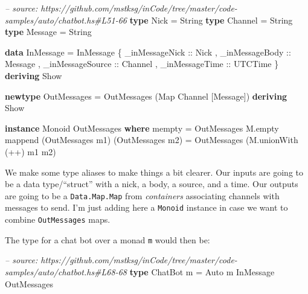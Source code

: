\documentclass[]{article}
\newenvironment{Shaded}{}{}
\newcommand{\KeywordTok}[1]{\textcolor[rgb]{0.00,0.44,0.13}{\textbf{{#1}}}}
\newcommand{\DataTypeTok}[1]{\textcolor[rgb]{0.56,0.13,0.00}{{#1}}}
\newcommand{\CommentTok}[1]{\textcolor[rgb]{0.38,0.63,0.69}{\textit{{#1}}}}
\newcommand{\OtherTok}[1]{\textcolor[rgb]{0.00,0.44,0.13}{{#1}}}
\newcommand{\FunctionTok}[1]{\textcolor[rgb]{0.02,0.16,0.49}{{#1}}}
\newcommand{\NormalTok}[1]{{#1}}
\begin{document}
\begin{Shaded}
\begin{Highlighting}[]
\CommentTok{-- source: https://github.com/mstksg/inCode/tree/master/code-samples/auto/chatbot.hs#L51-66}
\KeywordTok{type} \DataTypeTok{Nick}    \FunctionTok{=} \DataTypeTok{String}
\KeywordTok{type} \DataTypeTok{Channel} \FunctionTok{=} \DataTypeTok{String}
\KeywordTok{type} \DataTypeTok{Message} \FunctionTok{=} \DataTypeTok{String}

\KeywordTok{data} \DataTypeTok{InMessage} \FunctionTok{=} \DataTypeTok{InMessage} \NormalTok{\{ _}\OtherTok{inMessageNick   ::} \DataTypeTok{Nick}
                           \NormalTok{, _}\OtherTok{inMessageBody   ::} \DataTypeTok{Message}
                           \NormalTok{, _}\OtherTok{inMessageSource ::} \DataTypeTok{Channel}
                           \NormalTok{, _}\OtherTok{inMessageTime   ::} \DataTypeTok{UTCTime}
                           \NormalTok{\} }\KeywordTok{deriving} \DataTypeTok{Show}

\KeywordTok{newtype} \DataTypeTok{OutMessages} \FunctionTok{=} \DataTypeTok{OutMessages} \NormalTok{(}\DataTypeTok{Map} \DataTypeTok{Channel} \NormalTok{[}\DataTypeTok{Message}\NormalTok{]) }\KeywordTok{deriving} \DataTypeTok{Show}

\KeywordTok{instance} \DataTypeTok{Monoid} \DataTypeTok{OutMessages} \KeywordTok{where}
    \NormalTok{mempty  }\FunctionTok{=} \DataTypeTok{OutMessages} \NormalTok{M.empty}
    \NormalTok{mappend (}\DataTypeTok{OutMessages} \NormalTok{m1) (}\DataTypeTok{OutMessages} \NormalTok{m2)}
            \FunctionTok{=} \DataTypeTok{OutMessages} \NormalTok{(M.unionWith (}\FunctionTok{++}\NormalTok{) m1 m2)}
\end{Highlighting}
\end{Shaded}

We make some type aliases to make things a bit clearer. Our inputs are
going to be a data type/``struct'' with a nick, a body, a source, and a
time. Our outputs are going to be a \texttt{Data.Map.Map} from
\emph{containers} associating channels with messages to send. I'm just
adding here a \texttt{Monoid} instance in case we want to combine
\texttt{OutMessages} maps.

The type for a chat bot over a monad \texttt{m} would then be:

\begin{Shaded}
\begin{Highlighting}[]
\CommentTok{-- source: https://github.com/mstksg/inCode/tree/master/code-samples/auto/chatbot.hs#L68-68}
\KeywordTok{type} \DataTypeTok{ChatBot} \NormalTok{m }\FunctionTok{=} \DataTypeTok{Auto} \NormalTok{m }\DataTypeTok{InMessage} \DataTypeTok{OutMessages}
\end{Highlighting}
\end{Shaded}
\end{document}
